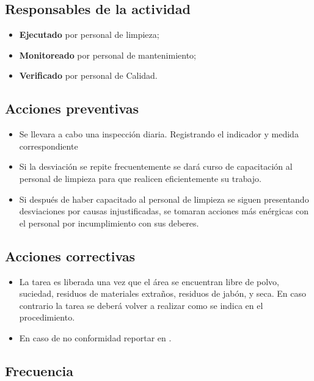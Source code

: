 \subsection{Responsables de la actividad}

\begin{itemize}
	\item \textbf{Ejecutado} por personal de limpieza;
	\item \textbf{Monitoreado} por personal de mantenimiento;
	\item \textbf{Verificado} por personal de Calidad.
\end{itemize}

\subsection{Acciones preventivas}

\begin{itemize}
	\item Se llevara a cabo una inspección diaria. Registrando el indicador y medida correspondiente
	\item Si la desviación se repite frecuentemente se dará curso de capacitación al personal de limpieza para que realicen eficientemente su trabajo.
	\item Si después de haber capacitado al personal de limpieza se siguen presentando desviaciones por causas injustificadas, se tomaran acciones más enérgicas con el personal por incumplimiento con sus deberes.
\end{itemize}

\subsection{Acciones correctivas}

\begin{itemize}
	\item La tarea es liberada una vez que el área se encuentran libre de polvo, suciedad, residuos de materiales extraños, residuos de jabón, y seca. En caso contrario la tarea se deberá volver a realizar como se indica en el procedimiento.
	\item En caso de no conformidad reportar en \RAC.
\end{itemize}

\subsection{Frecuencia}

